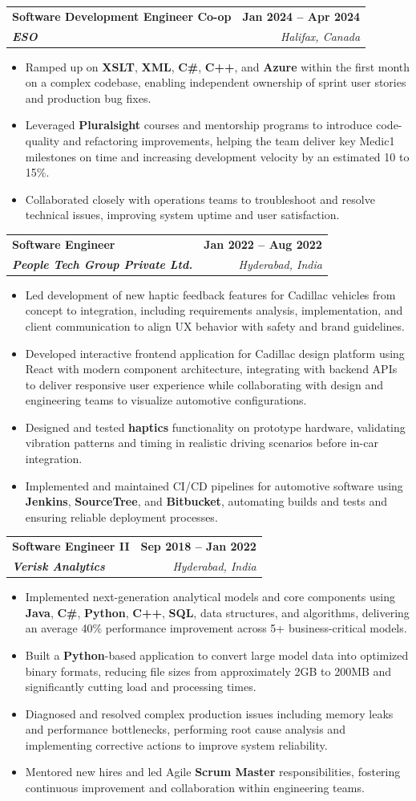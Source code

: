 \documentclass[letterpaper,11pt]{article}
\makeatletter
\newcommand{\resumeItem}[1]{
  \item\small{
    {#1 \vspace{-2pt}}
  }
}
\newcommand{\resumeSubheading}[4]{
  \vspace{-2pt}\item
    \begin{tabular*}{1.0\textwidth}[t]{l@{\extracolsep{\fill}}r}
      \textbf{#1} & \textbf{\small #2} \\
      \textit{\small#3} & \textit{\small #4} \\
    \end{tabular*}\vspace{-7pt}
}
\newcommand{\resumeItemListStart}{\begin{itemize}}
\newcommand{\resumeItemListEnd}{\end{itemize}\vspace{-5pt}}
\makeatother
\begin{document}
    \resumeSubheading
      {\textbf{Software Development Engineer Co-op}}{\textbf{Jan 2024 -- Apr 2024}}
      {\textbf{ESO}}{Halifax, Canada}
      \resumeItemListStart
        \resumeItem{Ramped up on \textbf{XSLT}, \textbf{XML}, \textbf{C\#}, \textbf{C++}, and \textbf{Azure} within the first month on a complex codebase, enabling independent ownership of sprint user stories and production bug fixes.}
        \resumeItem{Leveraged \textbf{Pluralsight} courses and mentorship programs to introduce code-quality and refactoring improvements, helping the team deliver key Medic1 milestones on time and increasing development velocity by an estimated 10 to 15\%.}
        \resumeItem{Collaborated closely with operations teams to troubleshoot and resolve technical issues, improving system uptime and user satisfaction.}
      \resumeItemListEnd

    \resumeSubheading
      {\textbf{Software Engineer}}{\textbf{Jan 2022 -- Aug 2022}}
      {\textbf{People Tech Group Private Ltd.}}{Hyderabad, India}
      \resumeItemListStart
        \resumeItem{Led development of new haptic feedback features for Cadillac vehicles from concept to integration, including requirements analysis, implementation, and client communication to align UX behavior with safety and brand guidelines.}
        \resumeItem{Developed interactive frontend application for Cadillac design platform using React with modern component architecture, integrating with backend APIs to deliver responsive user experience while collaborating with design and engineering teams to visualize automotive configurations.}
        \resumeItem{Designed and tested \textbf{haptics} functionality on prototype hardware, validating vibration patterns and timing in realistic driving scenarios before in-car integration.}
        \resumeItem{Implemented and maintained CI/CD pipelines for automotive software using \textbf{Jenkins}, \textbf{SourceTree}, and \textbf{Bitbucket}, automating builds and tests and ensuring reliable deployment processes.}
      \resumeItemListEnd

    \resumeSubheading
      {\textbf{Software Engineer II}}{\textbf{Sep 2018 -- Jan 2022}}
      {\textbf{Verisk Analytics}}{Hyderabad, India}
      \resumeItemListStart
        \resumeItem{Implemented next-generation analytical models and core components using \textbf{Java}, \textbf{C\#}, \textbf{Python}, \textbf{C++}, \textbf{SQL}, data structures, and algorithms, delivering an average 40\% performance improvement across 5+ business-critical models.}
        \resumeItem{Built a \textbf{Python}-based application to convert large model data into optimized binary formats, reducing file sizes from approximately 2GB to 200MB and significantly cutting load and processing times.}
        \resumeItem{Diagnosed and resolved complex production issues including memory leaks and performance bottlenecks, performing root cause analysis and implementing corrective actions to improve system reliability.}
        \resumeItem{Mentored new hires and led Agile \textbf{Scrum Master} responsibilities, fostering continuous improvement and collaboration within engineering teams.}
      \resumeItemListEnd
\end{document}
